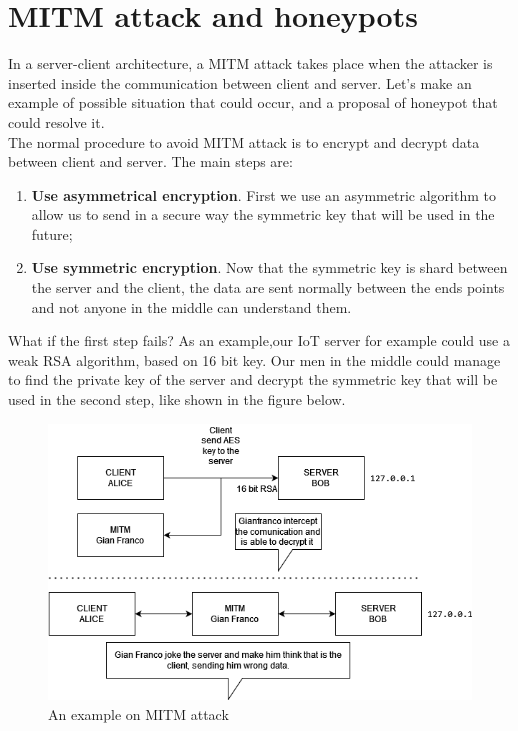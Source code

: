 \section{MITM attack and honeypots}
In a server-client architecture, a MITM attack takes place when the attacker is inserted inside the communication between client and server. Let's make an example of possible situation that could occur, and a proposal of honeypot that could resolve it. \\
The normal procedure to avoid MITM attack is to encrypt and decrypt data between client and server. The main steps are:
\begin{enumerate}
    \item \textbf{Use asymmetrical encryption}. First we use an asymmetric algorithm to allow us to send in a secure way the symmetric key that will be used in the future;
    \item \textbf{Use symmetric encryption}. Now that the symmetric key is shard between the server and the client, the data are sent normally between the ends points and not anyone in the middle can understand them.  
\end{enumerate}

\noindent What if the first step fails? As an example,our IoT server for example could use a weak RSA algorithm, based on 16 bit key. Our men in the middle could manage to find the private key of the server and decrypt the symmetric key that will be used in the second step, like shown in the figure below.

\begin{figure}[h!]
  \centering
  \includegraphics[width = 15cm]{images/MITMExampleAttack.drawio.png}
  \caption{An example on MITM attack}
  \label{fig:4period}
\end{figure}
\FloatBarrier

